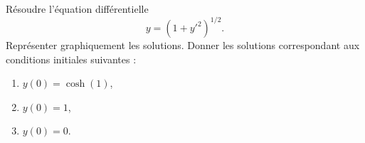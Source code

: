 

\begin{exercice}\label{exo_II-1-19}

Résoudre l'équation différentielle
\begin{equation}
	y=(1+y'^2)^{1/2}.
\end{equation}
Représenter graphiquement les solutions. Donner les solutions correspondant aux conditions initiales suivantes :
\begin{enumerate}
\item $y(0)=\cosh(1)$,
\item $y(0)=1$,
\item $y(0)=0$.
\end{enumerate}


\end{exercice}
